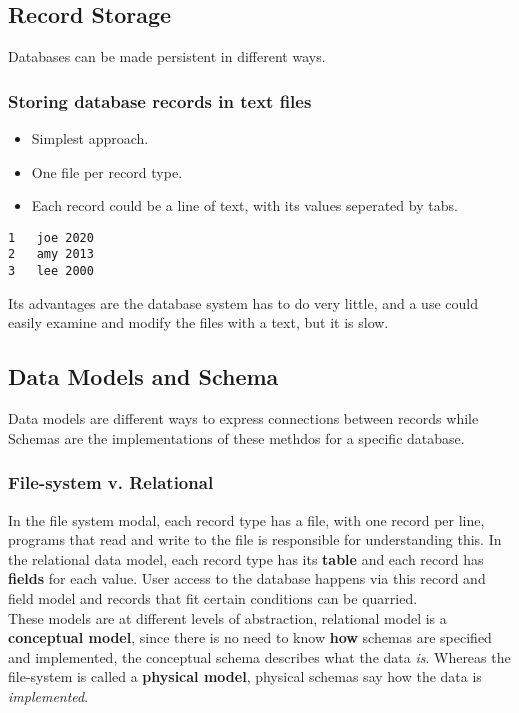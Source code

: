 \documentclass[11pt,a4paper,twocolumn]{book}
\begin{document}
\subsection{Record Storage}

Databases can be made persistent in different ways.

\subsubsection{Storing database records in text files}

\begin{itemize}
\item Simplest approach.
\item One file per record type.
\item Each record could be a line of text, with its values seperated by tabs.
\end{itemize}

\begin{lstlisting}
1	joe	2020
2	amy	2013
3	lee	2000
\end{lstlisting}

Its advantages are the database system has to do very little, and a use could easily examine and modify the files with a text, but it is slow. \missing

\subsection{Data Models and Schema}

Data models are different ways to express connections between records while Schemas are the implementations of these methdos for a specific database.

\subsubsection{File-system v. Relational}

In the file system modal, each record type has a file, with one record per line, programs that read and write to the file is responsible for understanding this. In the relational data model, each record type has its \textbf{table} and each record has \textbf{fields} for each value. User access to the database happens via this record and field model and records that fit certain conditions can be quarried.\\

These models are at different levels of abstraction, relational model is a \textbf{conceptual model}, since there is no need to know \textbf{how} schemas are specified and implemented, the conceptual schema describes what the data \textit{is}. Whereas the file-system is called a \textbf{physical model}, physical schemas say how the data is \textit{implemented}.
\end{document}
